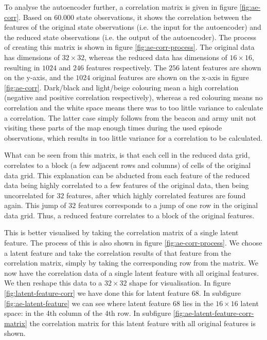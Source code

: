 To analyse the autoencoder further, a correlation matrix is given in figure \ref{fig:ae-corr}. Based on $60.000$ state observations, it shows the correlation between the features of the original state observations (i.e. the input for the autoencoder) and the reduced state observations (i.e. the output of the autoencoder). The process of creating this matrix is shown in figure \ref{fig:ae-corr-process}. The original data has dimensions of $32 \times 32$, whereas the reduced data has dimensions of $16 \times 16$, resulting in $1024$ and $246$ features respectively. The $256$ latent features are shown on the y-axis, and the $1024$ original features are shown on the x-axis in figure \ref{fig:ae-corr}. Dark/black and light/beige colouring mean a high correlation (negative and positive correlation respectively), whereas a red colouring means no correlation and the white space means there was to too little variance to calculate a correlation. The latter case simply follows from the beacon and army unit not visiting these parts of the map enough times during the used episode observations, which results in too little variance for a correlation to be calculated.

What can be seen from this matrix, is that each cell in the reduced data grid, correlates to a block (a few adjacent rows and columns) of cells of the original data grid. This explanation can be abducted from each feature of the reduced data being highly correlated to a few features of the original data, then being uncorrelated for $32$ features, after which highly correlated features are found again. This jump of $32$ features corresponds to a jump of one row in the original data grid. Thus, a reduced feature correlates to a block of the original features.

This is better visualised by taking the correlation matrix of a single latent feature. The process of this is also shown in figure \ref{fig:ae-corr-process}. We choose a latent feature and take the correlation results of that feature from the correlation matrix, simply by taking the corresponding row from the matrix. We now have the correlation data of a single latent feature with all original features. We then reshape this data to a $32 \times 32$ shape for visualisation. In figure \ref{fig:latent-feature-corr} we have done this for latent feature $68$. In subfigure \ref{fig:ae-latent-feature} we can see where latent feature $68$ lies in the $16 \times 16$ latent space: in the 4th column of the 4th row. In subfigure \ref{fig:ae-latent-feature-corr-matrix} the correlation matrix for this latent feature with all original features is shown.

